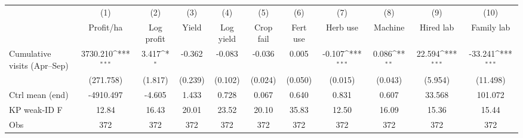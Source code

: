 {
\def\sym#1{\ifmmode^{#1}\else\(^{#1}\)\fi}
\begin{tabular}{l*{10}{c}}
\toprule
                    &\multicolumn{1}{c}{(1)}&\multicolumn{1}{c}{(2)}&\multicolumn{1}{c}{(3)}&\multicolumn{1}{c}{(4)}&\multicolumn{1}{c}{(5)}&\multicolumn{1}{c}{(6)}&\multicolumn{1}{c}{(7)}&\multicolumn{1}{c}{(8)}&\multicolumn{1}{c}{(9)}&\multicolumn{1}{c}{(10)}\\
                    &\multicolumn{1}{c}{Profit/ha}&\multicolumn{1}{c}{Log profit}&\multicolumn{1}{c}{Yield}&\multicolumn{1}{c}{Log yield}&\multicolumn{1}{c}{Crop fail}&\multicolumn{1}{c}{Fert use}&\multicolumn{1}{c}{Herb use}&\multicolumn{1}{c}{Machine}&\multicolumn{1}{c}{Hired lab}&\multicolumn{1}{c}{Family lab}\\
\midrule
Cumulative visits (Apr--Sep)&    3730.210\sym{***}&       3.417\sym{*}  &      -0.362         &      -0.083         &      -0.036         &       0.005         &      -0.107\sym{***}&       0.086\sym{**} &      22.594\sym{***}&     -33.241\sym{***}\\
                    &   (271.758)         &     (1.817)         &     (0.239)         &     (0.102)         &     (0.024)         &     (0.050)         &     (0.015)         &     (0.043)         &     (5.954)         &    (11.498)         \\
\midrule
Ctrl mean (end)     &   -4910.497         &      -4.605         &       1.433         &       0.728         &       0.067         &       0.640         &       0.831         &       0.607         &      33.568         &     101.072         \\
KP weak-ID F        &       12.84         &       16.43         &       20.01         &       23.52         &       20.10         &       35.83         &       12.50         &       16.09         &       15.36         &       15.44         \\
Obs                 &         372         &         372         &         372         &         372         &         372         &         372         &         372         &         372         &         372         &         372         \\
\bottomrule
\end{tabular}
}

